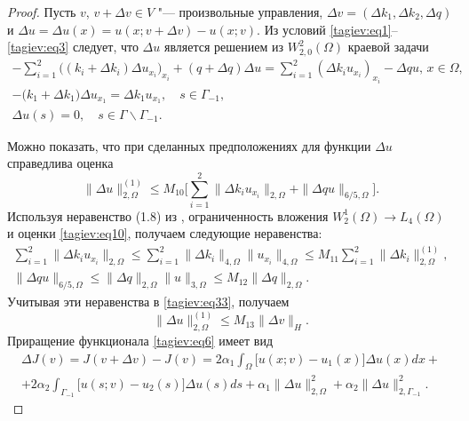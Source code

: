 \smallskip

\begin{proof} Пусть $ v $, $ v  +\Delta  v  \in 
V$ "--- произвольные управления, 
$\Delta  v  = (\Delta k_1 ,\Delta k_2  ,\Delta q )$ и $\Delta u=\Delta u ( x )=u (x; v  +\Delta  v  )-u (x; v )$. 
Из условий 
 \eqref{tagiev:eq1}--\eqref{tagiev:eq3} следует, что $\Delta u$ является решением из $W_{2,0}^2 (\Omega )$ краевой задачи
\begin{gather}
\label{tagiev:eq30}
{-}\sum\limits_{i=1}^2 \bigl( (k_i +\Delta k_i ) \Delta u_{x_i  } \bigr)_{x_i } + ( q+\Delta q )\Delta u= \sum\limits_{i=1}^2 
(\Delta k_i u_{x_i } )_{x_i } -\Delta qu,\, x\in \Omega,\\ 
\label{tagiev:eq32}
- \big(k_1 +\Delta k_1 \big)\Delta u_{x_1 } =\Delta k_1 u_{x_1 },\quad s\in \Gamma _{-1} ,\\
\label{tagiev:eq32}
\Delta u ( s )=0,\quad s\in \Gamma \backslash \Gamma _{-1}. 
\end{gather}

Можно показать, что при сделанных предположениях для функции $\Delta u$ 
справедлива оценка \cite[c.~200]{tagiev:bib17}
\begin{equation}
\label{tagiev:eq33}
\|\Delta u \|_{2,\Omega }^{ ( 1 )} \le M_{10} 
\biggl[\sum\limits_{i=1}^2 \|\Delta k_i u_{x_i } \|_{2,\Omega } 
 + \| \Delta qu  \|_{6/5,\Omega}  \biggr].
\end{equation}
Используя неравенство (1.8) из \cite[c.~67]{tagiev:bib17}, ограниченность вложения $W_2^1 
 ( \Omega )\to L_4 ( \Omega )$ и оценки \eqref{tagiev:eq10}, получаем 
следующие неравенства: 
\begin{gather*}
\sum\limits_{i=1}^2 \| \Delta k_i u_{x_i } \|_{2,\Omega} 
\le \sum\limits_{i=1}^2 \| \Delta k_i  \|_{4,\Omega}  
 \| u_{x_i }  \|_{4,\Omega } \le M_{11} \sum\limits_{i=1}^2 
 \| \Delta k_i \|_{2,\Omega }^{ ( 1 )},\\
 \| \Delta qu \|_{6/5,\Omega } \le \| \Delta q \|_{2,\Omega } \| u \|_{3,\Omega } \le M_{12} \| 
\Delta q \|_{2,\Omega }.
\end{gather*}
Учитывая эти неравенства в \eqref{tagiev:eq33}, получаем
\begin{equation}
\label{tagiev:eq34}
 \| \Delta u \|_{2,\Omega }^{ ( 1 )} \le M_{13}   \|\Delta  v  \|_H.
\end{equation}
Приращение функционала \eqref{tagiev:eq6} имеет вид 
\begin{multline}
\label{tagiev:eq35}
\Delta J (  v  )=J (  v  +\Delta  v   )-J (  v  )=2\alpha _1 \int _\Omega \bigl [u ( x; v  )-u_1 ( x ) \bigr]\Delta u ( x   )dx+ \\ 
 +2\alpha _2 \int _{\Gamma _{-1} }  \bigl[u (s; v  )-u_2 ( s )\bigr]\Delta u ( s )ds +\alpha _1 
 \| \Delta u \|_{2,\Omega }^2 +\alpha _2 \| \Delta u \|_{2,\Gamma _{-1} }^2. 
\end{multline}


\end{proof}
